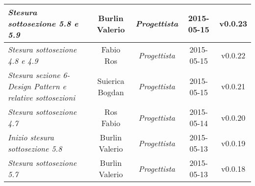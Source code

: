 \begin{table}[h]
\begin{tabular}{|p{}|c|c|c|c|}
	\midrule
		\textit{Stesura sottosezione 5.8 e 5.9} & Burlin Valerio & \textit{Progettista} & 2015-05-15 & v0.0.23 \\
	\midrule
		\textit{Stesura sottosezione 4.8 e 4.9} & Fabio Ros & \textit{Progettista} & 2015-05-15 & v0.0.22 \\
	\midrule
		\textit{Stesura sezione 6-Design Pattern e relative sottosezioni} & Suierica Bogdan & \textit{Progettista} & 2015-05-15 & v0.0.21 \\
	\midrule
		\textit{Stesura sottosezione 4.7} & Ros Fabio & \textit{Progettista} & 2015-05-14 & v0.0.20 \\
	\midrule
		\textit{Inizio stesura sottosezione 5.8} & Burlin Valerio & \textit{Progettista} & 2015-05-13 & v0.0.19 \\
	\midrule
		\textit{Stesura sottosezione 5.7} & Burlin Valerio & \textit{Progettista} & 2015-05-13 & v0.0.18 \\
	\bottomrule
\end{tabular}	
\end{table}

\newpage

